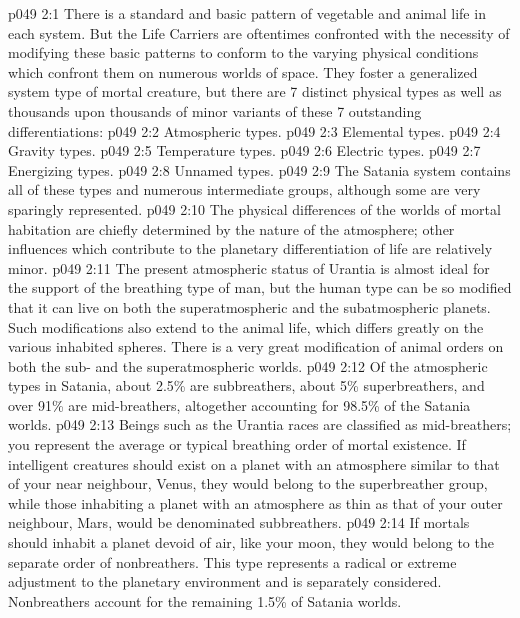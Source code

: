 \vs p049 2:1 There is a standard and basic pattern of vegetable and animal life in each system. But the Life Carriers are oftentimes confronted with the necessity of modifying these basic patterns to conform to the varying physical conditions which confront them on numerous worlds of space. They foster a generalized system type of mortal creature, but there are 7 distinct physical types as well as thousands upon thousands of minor variants of these 7 outstanding differentiations:
\vs p049 2:2 \bibnobreakspace Atmospheric types.
\vs p049 2:3 \bibnobreakspace Elemental types.
\vs p049 2:4 \bibnobreakspace Gravity types.
\vs p049 2:5 \bibnobreakspace Temperature types.
\vs p049 2:6 \bibnobreakspace Electric types.
\vs p049 2:7 \bibnobreakspace Energizing types.
\vs p049 2:8 \bibnobreakspace Unnamed types.
\vs p049 2:9 \pc The Satania system contains all of these types and numerous intermediate groups, although some are very sparingly represented.
\vs p049 2:10 \bibnobreakspace {} The physical differences of the worlds of mortal habitation are chiefly determined by the nature of the atmosphere; other influences which contribute to the planetary differentiation of life are relatively minor.
\vs p049 2:11 The present atmospheric status of Urantia is almost ideal for the support of the breathing type of man, but the human type can be so modified that it can live on both the superatmospheric and the subatmospheric planets. Such modifications also extend to the animal life, which differs greatly on the various inhabited spheres. There is a very great modification of animal orders on both the sub\hyp{} and the superatmospheric worlds.
\vs p049 2:12 Of the atmospheric types in Satania, about 2.5\% are subbreathers, about 5\% superbreathers, and over 91\% are mid\hyp{}breathers, altogether accounting for 98.5\% of the Satania worlds.
\vs p049 2:13 Beings such as the Urantia races are classified as mid\hyp{}breathers; you represent the average or typical breathing order of mortal existence. If intelligent creatures should exist on a planet with an atmosphere similar to that of your near neighbour, Venus, they would belong to the superbreather group, while those inhabiting a planet with an atmosphere as thin as that of your outer neighbour, Mars, would be denominated subbreathers.
\vs p049 2:14 If mortals should inhabit a planet devoid of air, like your moon, they would belong to the separate order of nonbreathers. This type represents a radical or extreme adjustment to the planetary environment and is separately considered. Nonbreathers account for the remaining 1.5\% of Satania worlds.
